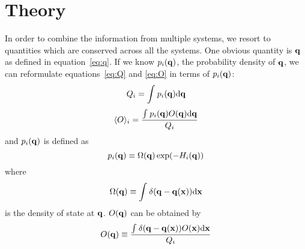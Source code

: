 \section{Theory} 
In order to combine the information from multiple systems, we resort to 
quantities which are conserved across all the systems. One obvious quantity 
is $\mathbf{q}$ as defined in equation~\ref{eq:q}. If we know $p_{i}(\mathbf{q})$, 
the probability density of $\mathbf{q}$, we can reformulate equations~\ref{eq:Q} 
and \ref{eq:O} in terms of $p_{i}(\mathbf{q})$:
\begin{equation}
Q_{i} = \int_{}^{}{p_{i}}(\mathbf{\mathbf{q}})\mathrm{d}\mathbf{\mathbf{q}}
\label{eq:Q_q}
\end{equation}
\begin{equation}
\langle O \rangle_{i} = \frac{\int_{}^{}{p_{i}(\mathbf{q})O}(\mathbf{\mathbf{q}})\mathrm{d}\mathbf{\mathbf{q}}}{Q_{i}} 
\label{eq:Oavg_q}
\end{equation}
and $p_{i}(\mathbf{q})$ is defined as
\begin{equation}
p_{i}(\mathbf{q}) \equiv \Omega(\mathbf{q}) \exp(-H_{i}(\mathbf{q})) 
\label{eq:p_q}
\end{equation}
where
\begin{equation}
\Omega(\mathbf{q}) \equiv \int_{}^{}{\delta(\mathbf{q}-\mathbf{q}(\mathbf{x}))}\mathrm{d}\mathbf{x}
\label{eq:omega}
\end{equation}
is the density of state at $\mathbf{q}$. $O(\mathbf{q})$ can be obtained by
\begin{equation}
O(\mathbf{q}) \equiv \frac{\int_{}^{}{\delta(\mathbf{q}-\mathbf{q}(\mathbf{x}))O}(\mathbf{\mathbf{x}})\mathrm{d}\mathbf{\mathbf{x}}}{Q_{i}}
\label{eq:O_q}
\end{equation}

